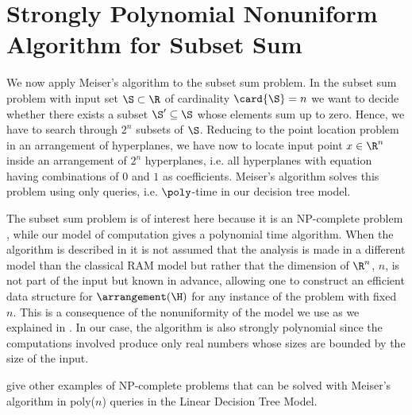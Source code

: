 \section[Strongly Polynomial Nonuniform Algorithm \dots]{Strongly Polynomial Nonuniform Algorithm for Subset Sum}

We now apply Meiser's algorithm to the subset sum problem. In the subset sum
problem with input set $\S \subset \R$ of cardinality $\card{\S} = n$ we want to
decide whether there exists a subset $\S' \subseteq \S$ whose elements sum up to zero. Hence, we have
to search through $2^n$ subsets of $\S$. Reducing to the point location problem
in an arrangement of hyperplanes, we have now to locate input point $x \in
\R^n$ inside an arrangement of $2^n$ hyperplanes, i.e. all hyperplanes with
equation having combinations of $0$ and $1$ as coefficients. Meiser's algorithm
solves this problem using only  queries, i.e. $\poly$-time
in our decision tree model.

The subset sum problem is of interest here because it is an NP-complete problem
\cite{karp:1972}, while our model of computation gives a polynomial time
algorithm. When the algorithm is described in \cite{burgisser:1997} it is not
assumed that the analysis is made in a different model than the classical
RAM model but rather that the dimension of $\R^n$, $n$, is not part of the input
but known in advance, allowing one to construct an efficient data structure for
$\arrangement(\H)$ for any instance of the problem with fixed $n$.
This is a consequence of the nonuniformity of the model we use as we explained
in . In our case, the algorithm is
also strongly polynomial since the computations involved produce only real
numbers whose sizes are bounded by the size of the input.

\citet*{meiser:1993,burgisser:1997} give other examples of
NP-complete problems that can be solved with Meiser's algorithm in poly(\(n\))
queries in the Linear Decision Tree Model.
